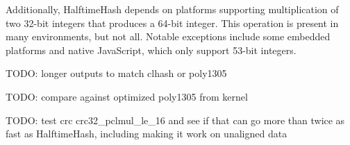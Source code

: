 \documentclass[sigconf, nonacm]{acmart}
\begin{document}
Additionally, HalftimeHash depends on platforms supporting multiplication of two 32-bit integers that produces a 64-bit integer.
This operation is present in many environments, but not all.
Notable exceptions include some embedded platforms and native JavaScript, which only support 53-bit integers.

TODO: longer outputs to match clhash or poly1305

TODO: compare against optimized poly1305 from kernel

TODO: test crc crc32\_pclmul\_le\_16 and see if that can go more than twice as fast as HalftimeHash, including making it work on unaligned data








\end{document}
